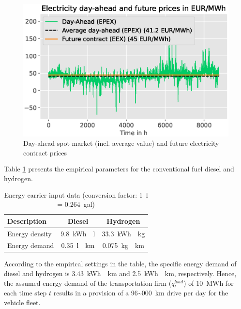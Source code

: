 \documentclass[review]{elsarticle}
\begin{document}
\begin{figure}[h]
	\centering
	\includegraphics[width=0.8\linewidth]{figures/hourly_values.eps}
	\caption{Day-ahead spot market (incl. average value) and future electricity contract prices}
	\label{fig:price_development}
\end{figure}

Table \ref{tab:appendix} presents the empirical parameters for  the conventional fuel diesel and hydrogen. 

\begin{table}[h]
	\setlength{\extrarowheight}{.5em}
	\centering
	\begin{tabular}{lcc}
		\toprule
		Description & Diesel & Hydrogen\\
		\hline 
		Energy density & \SI{9.8}{kWh \per l} & \SI{33.3}{kWh \per kg}\\
		Energy demand & \SI{0.35}{l \per km} & \SI{0.075}{kg \per km}\\
		\bottomrule
	\end{tabular}
	\caption{Energy carrier input data (conversion factor: \SI{1}{\litre} = \SI{0.264}{gal})}
	\label{tab:appendix}
\end{table}

According to the empirical settings in the table, the specific energy demand of diesel and hydrogen is \SI{3.43}{kWh \per km} and \SI{2.5}{kWh \per km}, respectively. Hence, the assumed energy demand of the transportation firm ($q_{t}^{load}$) of \SI{10}{MWh} for each time step $t$ results in a provision of a \SI{96~000}{km} drive per day for the vehicle fleet. 
\end{document}

